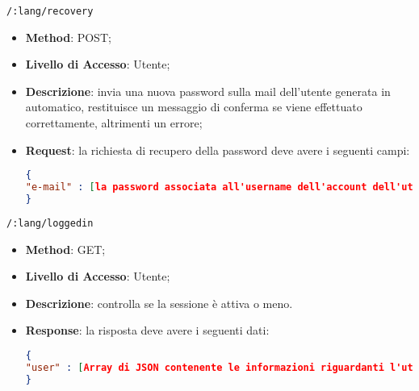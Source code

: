 	\item \texttt{/:lang/recovery}
		\begin{itemize}
			\item \textbf{Method}: POST;
			\item \textbf{Livello di Accesso}: Utente;
			\item \textbf{Descrizione}: invia una nuova password sulla mail dell'utente generata in automatico, restituisce un messaggio di conferma se viene effettuato correttamente, altrimenti un errore;
			\item \textbf{Request}: la richiesta di recupero della password deve avere i seguenti campi:
\begin{lstlisting}[language=json,firstnumber=1]
{
"e-mail" : [la password associata all'username dell'account dell'utente]
}
\end{lstlisting}
		\end{itemize}
		
	\item \texttt{/:lang/loggedin}
		\begin{itemize}
			\item \textbf{Method}: GET;
			\item \textbf{Livello di Accesso}: Utente;
			\item \textbf{Descrizione}: controlla se la sessione è attiva o meno.
			\item \textbf{Response}: la risposta deve avere i seguenti dati:
\begin{lstlisting}[language=json,firstnumber=1]
{
"user" : [Array di JSON contenente le informazioni riguardanti l'utente autenticato]
}
\end{lstlisting}
		\end{itemize}	